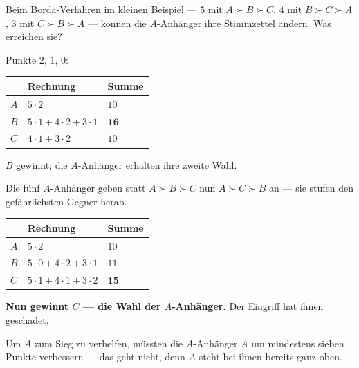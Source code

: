 \begin{aufgabe}
Beim Borda-Verfahren im kleinen Beispiel --- $5$ mit $A\succ B\succ C$, $4$ mit $B\succ C\succ A$, $3$ mit $C\succ B\succ A$ --- können die $A$-Anhänger ihre Stimmzettel ändern. Was erreichen sie?

\loesung
{}
Punkte $2$, $1$, $0$:
\begin{center}
{\small
\renewcommand{\arraystretch}{1.48}
\begin{tabular}{@{}P{1.6cm}P{3.2cm}P{1.6cm}@{}}
\toprule
& \textbf{Rechnung} & \textbf{Summe}\\
\midrule
$A$ & $5\cdot2$ & $10$\\
$B$ & $5\cdot1+4\cdot2+3\cdot1$ & $\mathbf{16}$\\
$C$ & $4\cdot1+3\cdot2$ & $10$\\
\bottomrule
\end{tabular}}
\end{center}

$B$ gewinnt; die $A$-Anhänger erhalten ihre zweite Wahl.

Die fünf $A$-Anhänger geben statt $A\succ B\succ C$ nun $A\succ C\succ B$ an --- sie stufen den gefährlichsten Gegner herab.

\begin{center}
{\small
\renewcommand{\arraystretch}{1.48}
\begin{tabular}{@{}P{1.6cm}P{3.2cm}P{1.6cm}@{}}
\toprule
& \textbf{Rechnung} & \textbf{Summe}\\
\midrule
$A$ & $5\cdot2$ & $10$\\
$B$ & $5\cdot0+4\cdot2+3\cdot1$ & $11$\\
$C$ & $5\cdot1+4\cdot1+3\cdot2$ & $\mathbf{15}$\\
\bottomrule
\end{tabular}}
\end{center}

\begin{center}
\begin{minipage}{0.9\textwidth}
\textbf{Nun gewinnt $C$ --- die  Wahl der $A$-Anhänger.} Der Eingriff hat ihnen geschadet.
\end{minipage}
\end{center}

Um $A$ zum Sieg zu verhelfen, müssten die $A$-Anhänger $A$ um mindestens sieben Punkte verbessern --- das geht nicht, denn $A$ steht bei ihnen bereits ganz oben.


\end{aufgabe}

